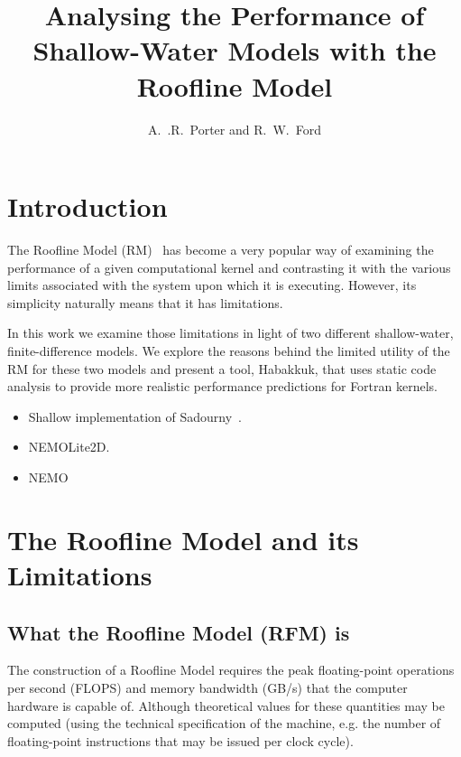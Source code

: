 \documentclass[12pt]{article}
\begin{document}
\title{Analysing the Performance of Shallow-Water Models with the
 Roofline Model}

\author{A.~.R.~Porter and R.~W.~Ford}

\maketitle

\tableofcontents

\section{Introduction}

The Roofline Model (RM)~\cite{roofline} has become a very popular way
of examining the performance of a given computational kernel and
contrasting it with the various limits associated with the system upon
which it is executing. However, its simplicity naturally means that
it has limitations.

In this work we examine those limitations in light of two different
shallow-water, finite-difference models. We explore the reasons behind
the limited utility of the RM for these two models and present a
tool, Habakkuk, that uses static code analysis to provide more
realistic performance predictions for Fortran kernels.

\begin{itemize}
\item Shallow implementation of Sadourny~\cite{sadourny75}.
\item NEMOLite2D.
\item NEMO
\end{itemize}

\section{The Roofline Model and its Limitations}

\subsection{What the Roofline Model (RFM) is}

The construction of a Roofline Model requires the peak floating-point
operations per second (FLOPS) and memory bandwidth (GB/s) that the
computer hardware is capable of. Although theoretical values for these
quantities may be computed (using the technical specification of
the machine, e.g. the number of floating-point instructions that may
be issued per clock cycle).
\end{document}
